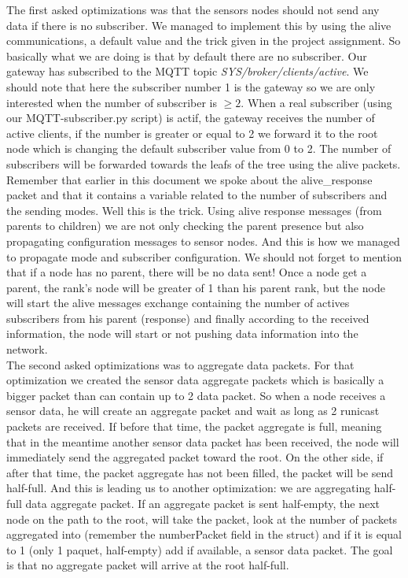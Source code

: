 \documentclass[a4paper,10pt]{article}
\begin{document}
The first asked optimizations was that the sensors nodes should not send any data if there is no subscriber. We managed to implement this by using the alive communications, a default value and the trick given in the project assignment. So basically what we are doing is that by default there are no subscriber. Our gateway has subscribed to the MQTT topic \emph{SYS/broker/clients/active}. We should note that here the subscriber number 1 is the gateway so we are only interested when the number of subscriber is $\geq 2$. When a real subscriber (using our MQTT-subscriber.py script) is actif, the gateway receives the number of active clients, if the number is greater or equal to 2 we forward it to the root node which is changing the default subscriber value from 0 to 2. The number of subscribers will be forwarded towards the leafs of the tree using the alive packets. Remember that earlier in this document we spoke about the alive\_response packet and that it contains a variable related to the number of subscribers and the sending modes. Well this is the trick. Using alive response messages (from parents to children) we are not only checking the parent presence but also propagating configuration messages to sensor nodes. And this is how we managed to propagate mode and subscriber configuration. We should not forget to mention that if a node has no parent, there will be no data sent! Once a node get a parent, the rank's node will be greater of 1 than his parent rank, but the node will start the alive messages exchange containing the number of actives subscribers from his parent (response) and finally according to the received information, the node will start or not pushing data information into the network. \\

The second asked optimizations was to aggregate data packets. For that optimization we created the sensor data aggregate packets which is basically a bigger packet than can contain up to 2 data packet. So when a node receives a sensor data, he will create an aggregate packet and wait as long as 2 runicast packets are received. If before that time, the packet aggregate is full, meaning that in the meantime another sensor data packet has been received, the node will immediately send the  aggregated packet toward the root. On the other side, if after that time,  the packet aggregate has not been filled, the packet will be send half-full. And this is leading us to another optimization: we are aggregating half-full data aggregate packet. If an aggregate packet is sent half-empty, the next node on the path to the root, will take the packet, look at the number of packets aggregated into (remember the numberPacket field in the struct) and if it is equal to 1 (only 1 paquet, half-empty) add if available, a sensor data packet. The goal is that no aggregate packet will arrive at the root half-full. 
\end{document}
